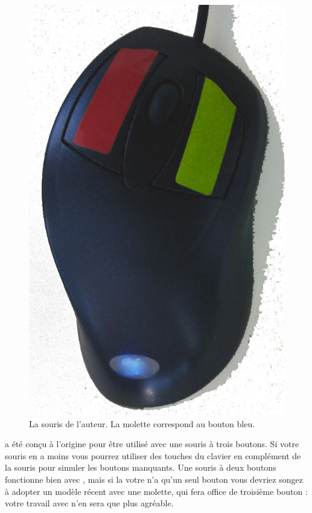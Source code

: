 \documentclass[a4paper,10pt,twoside]{book}
\begin{document}
\begin{figure}
\includegraphics[width=0.95\linewidth]{colouredMouse}
\caption{La souris de l'auteur. La molette correspond au bouton bleu.}
\label{fig:colouredMouse}
\end{figure}

\sq a été conçu à l'origine pour être utilisé avec une souris à trois boutons. Si votre souris en a moins vous pourrez utiliser des touches du clavier en complément de la souris pour simuler les boutons manquants. Une souris à deux boutons fonctionne bien avec \sq, mais si la votre n'a qu'un seul bouton vous devriez songez à adopter un modèle récent avec une molette, qui fera office de troisième bouton : votre travail avec \sq n'en sera que plus agréable.
\end{document}
